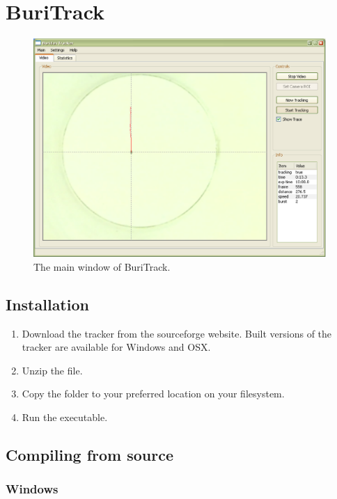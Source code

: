 \documentclass[11pt,a4paper]{article}
\begin{document}
\section{BuriTrack}

\begin{figure}[h]
    	\mbox{\includegraphics[width=0.99\textwidth]{figures/tracker_mainscreen.eps}}
 	\caption{The main window of BuriTrack.}
  	\label{fig:mainscreen}
 \end{figure}

\subsection{Installation}

\begin{enumerate}
\item Download the tracker from the sourceforge website. Built versions of the tracker are available for Windows and OSX. 
\item Unzip the file. 
\item Copy the folder to your preferred location on your filesystem.
\item Run the executable.
\end{enumerate}

\subsection{Compiling from source}

\subsubsection{Windows}
\end{document}
